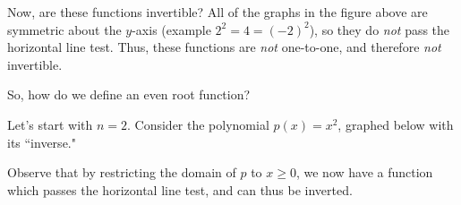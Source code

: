 \documentclass{ximera}
\begin{document}
Now, are these functions invertible? All of the graphs in the figure above are symmetric about the $y$-axis (example $2^2 = 4 = (-2)^2$), so they do {\em not} pass the horizontal line test. Thus, these functions are {\em not} one-to-one, and therefore {\em not} invertible.

So, how do we define an even root function?

Let's start with $n=2$. Consider the polynomial $p(x)=x^2$, graphed below with its ``inverse." 
\begin{image}
\end{image}

Observe that by restricting the domain of $p$ to $x \geq 0$, we now have a function which passes the horizontal line test, and can thus be inverted.
\end{document}
